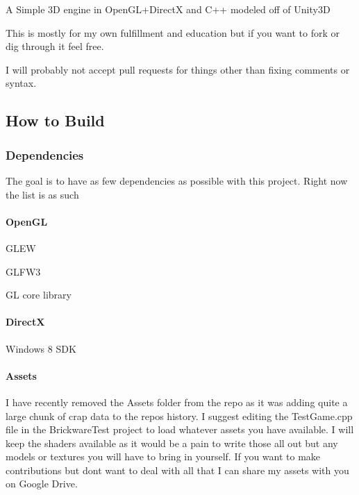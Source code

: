  

A Simple 3\+D engine in Open\+G\+L+\+Direct\+X and C++ modeled off of Unity3\+D

This is mostly for my own fulfillment and education but if you want to fork or dig through it feel free.

I will probably not accept pull requests for things other than fixing comments or syntax. 



\subsection*{How to Build}

\subsubsection*{Dependencies}

The goal is to have as few dependencies as possible with this project. Right now the list is as such

\paragraph*{Open\+G\+L}


\begin{DoxyItemize}
\item G\+L\+E\+W
\item G\+L\+F\+W3
\item G\+L core library
\end{DoxyItemize}

\paragraph*{Direct\+X}


\begin{DoxyItemize}
\item Windows 8 S\+D\+K
\end{DoxyItemize}

\paragraph*{Assets}

I have recently removed the Assets folder from the repo as it was adding quite a large chunk of crap data to the repo\textquotesingle{}s history. I suggest editing the {\ttfamily Test\+Game.\+cpp} file in the Brickware\+Test project to load whatever assets you have available. I will keep the shaders available as it would be a pain to write those all out but any models or textures you will have to bring in yourself. If you want to make contributions but don\textquotesingle{}t want to deal with all that I can share my assets with you on Google Drive.

